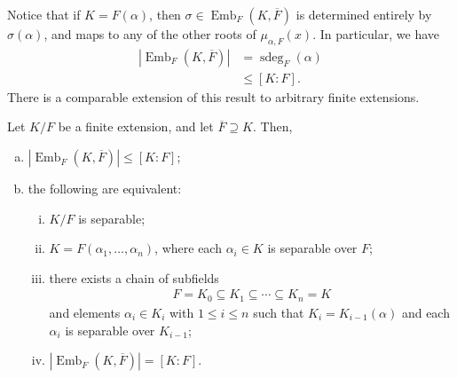 \documentclass[10pt]{mypackage}
\begin{document}
Notice that if $K = F\left( \alpha \right)$, then $\sigma\in \operatorname{Emb}_F\left( K, \overline{F} \right)$ is determined entirely by $\sigma\left( \alpha \right)$, and maps to any of the other roots of $\mu_{\alpha,F}(x)$. In particular, we have
\begin{align*}
  \left\vert \operatorname{Emb}_F\left( K, \overline{F} \right) \right\vert &= \operatorname{sdeg}_{F}\left( \alpha \right)\\
                                                                            &\leq \left[ K:F \right].
\end{align*}
There is a comparable extension of this result to arbitrary finite extensions.
\begin{proposition}
  Let $K/F$ be a finite extension, and let $ \overline{F}\supseteq K $. Then,
  \begin{enumerate}[(a)]
    \item $\left\vert \operatorname{Emb}_F\left( K, \overline{F} \right) \right\vert \leq \left[ K:F \right]$;
    \item the following are equivalent:
      \begin{enumerate}[(i)]
        \item $K/F$ is separable;
        \item $K = F\left( \alpha_1,\dots,\alpha_n \right)$, where each $\alpha_i\in K$ is separable over $F$;
        \item there exists a chain of subfields
          \begin{align*}
            F = K_0\subseteq K_1\subseteq\cdots\subseteq K_n = K
          \end{align*}
          and elements $\alpha_i\in K_i$ with $1\leq i \leq n$ such that $K_i = K_{i-1}\left( \alpha \right)$ and each $\alpha_i$ is separable over $K_{i-1}$;
        \item $\left\vert \operatorname{Emb}_F\left( K, \overline{F} \right) \right\vert = \left[ K:F \right]$.
      \end{enumerate}
  \end{enumerate}
\end{proposition}
\end{document}
